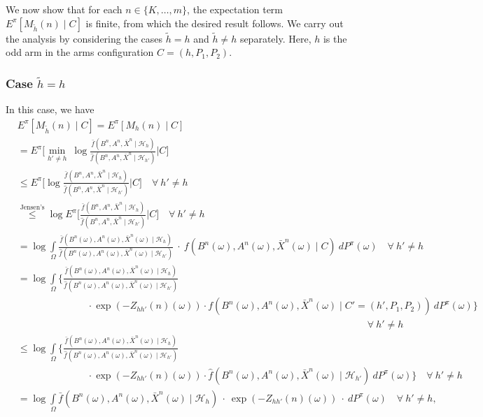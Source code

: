 We now show that for each $n\in \{K, \ldots, m\}$, the expectation term $E^\pi[M_{\tilde{h}}(n)\mid C]$ is finite, from which the desired result follows.
We carry out the analysis by considering the cases $\tilde{h}=h$ and $\tilde{h}\neq h$ separately. Here, $h$ is the odd arm in the arms configuration $C=(h, P_1, P_2)$.

\subsubsection{Case $\tilde{h}=h$}
In this case, we have
\begin{align}
	&E^\pi[M_{\tilde{h}}(n)\mid C]=E^\pi[M_{h}(n)\mid C]\nonumber\\
	&=E^\pi\bigg[\min\limits_{h'\neq h}~\log \frac{\bar{f}(B^n, A^n, \bar{X}^n \mid \mathcal{H}_{h})}{\hat{f}(B^n, A^n, \bar{X}^n \mid \mathcal{H}_{h'})}\bigg \vert C \bigg]\nonumber\\
	&\leq E^\pi\bigg[\log \frac{\bar{f}(B^n, A^n, \bar{X}^n \mid \mathcal{H}_{h})}{\hat{f}(B^n, A^n, \bar{X}^n \mid \mathcal{H}_{h'})}\bigg \vert C\bigg]\quad \forall~h'\neq h\nonumber\\
	&\stackrel{\text{Jensen's}}{\leq} \log E^\pi\bigg[\frac{\bar{f}(B^n, A^n, \bar{X}^n \mid \mathcal{H}_{h})}{\hat{f}(B^n, A^n, \bar{X}^n \mid \mathcal{H}_{h'})}\bigg \vert C\bigg]\quad \forall ~ h'\neq h\nonumber\\
	&= \log  \int\limits_{\Omega} \frac{\bar{f}(B^n(\omega), A^n(\omega), \bar{X}^n(\omega) \mid \mathcal{H}_{h})}{\hat{f}(B^n(\omega), A^n(\omega), \bar{X}^n(\omega) \mid \mathcal{H}_{h'})} ~\cdot ~ f(B^n(\omega), A^n(\omega), \bar{X}^n(\omega) \mid C)~dP^\pi(\omega)\quad \forall~h'\neq h\nonumber\\
	& = \log \int\limits_{\Omega}\bigg\lbrace\frac{\bar{f}(B^n(\omega), A^n(\omega), \bar{X}^n(\omega) \mid \mathcal{H}_{h})}{\hat{f}(B^n(\omega), A^n(\omega), \bar{X}^n(\omega) \mid \mathcal{H}_{h'})}\nonumber\\
	&\hspace{3cm} \cdot\exp(-Z_{hh'}(n) (\omega))\cdot f(B^n(\omega), A^n(\omega), \bar{X}^n(\omega) \mid C'=(h', P_1, P_2))~dP^\pi(\omega)\bigg\rbrace \nonumber\\
	&\hspace{15cm} \forall~h'\neq h\nonumber\\
	&\leq \log \int\limits_{\Omega}\bigg\lbrace\frac{\bar{f}(B^n(\omega), A^n(\omega), \bar{X}^n(\omega) \mid \mathcal{H}_{h})}{\hat{f}(B^n(\omega), A^n(\omega), \bar{X}^n(\omega) \mid \mathcal{H}_{h'})} \nonumber\\
	&\hspace{3cm}\cdot\exp(-Z_{hh'}(n)(\omega))\cdot \hat{f}(B^n(\omega), A^n(\omega), \bar{X}^n(\omega) \mid \mathcal{H}_{h'})~dP^\pi(\omega)\bigg\rbrace \quad \forall~h'\neq h\nonumber\\
	&=\log \int\limits_{\Omega}\bar{f}(B^n(\omega), A^n(\omega), \bar{X}^n(\omega) \mid \mathcal{H}_{h}) ~\cdot~\exp(-Z_{hh'}(n)( \omega))~\cdot ~dP^\pi(\omega) \quad \forall~h'\neq h,
	\label{eq:proof_of_stopping_time_blowing_up_6}
\end{align}
